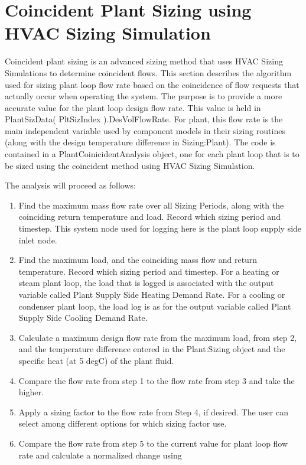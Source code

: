\section{Coincident Plant Sizing using HVAC Sizing Simulation}\label{coincident-plant-sizing-using-hvac-sizing-simulation}

Coincident plant sizing is an advanced sizing method that uses HVAC Sizing Simulations to determine coincident flows. This section describes the algorithm used for sizing plant loop flow rate based on the coincidence of flow requests that actually occur when operating the system. The purpose is to provide a more accurate value for the plant loop design flow rate. This value is held in PlantSizData( PltSizIndex ).DesVolFlowRate. For plant, this flow rate is the main independent variable used by component models in their sizing routines (along with the design temperature difference in Sizing:Plant). The code is contained in a PlantCoinicidentAnalysis object, one for each plant loop that is to be sized using the coincident method using HVAC Sizing Simulation.

The analysis will proceed as follows:

\begin{enumerate}
\def\labelenumi{\arabic{enumi}.}
\item
  Find the maximum mass flow rate over all Sizing Periods, along with the coinciding return temperature and load. Record which sizing period and timestep. This system node used for logging here is the plant loop supply side inlet node.
\item
  Find the maximum load, and the coinciding mass flow and return temperature. Record which sizing period and timestep. For a heating or steam plant loop, the load that is logged is associated with the output variable called Plant Supply Side Heating Demand Rate. For a cooling or condenser plant loop, the load log is as for the output variable called Plant Supply Side Cooling Demand Rate.
\item
  Calculate a maximum design flow rate from the maximum load, from step 2, and the temperature difference entered in the Plant:Sizing object and the specific heat (at 5 degC) of the plant fluid.
\item
  Compare the flow rate from step 1 to the flow rate from step 3 and take the higher.
\item
  Apply a sizing factor to the flow rate from Step 4, if desired. The user can select among different options for which sizing factor use.
\item
  Compare the flow rate from step 5 to the current value for plant loop flow rate and calculate a normalized change using
\end{enumerate}

